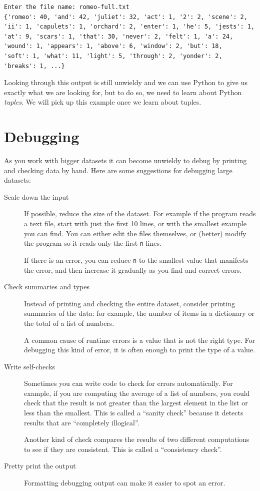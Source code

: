 \documentclass[10pt,]{book}
\begin{document}
{\small
\begin{verbatim}
Enter the file name: romeo-full.txt
{'romeo': 40, 'and': 42, 'juliet': 32, 'act': 1, '2': 2, 'scene': 2,
'ii': 1, 'capulets': 1, 'orchard': 2, 'enter': 1, 'he': 5, 'jests': 1,
'at': 9, 'scars': 1, 'that': 30, 'never': 2, 'felt': 1, 'a': 24,
'wound': 1, 'appears': 1, 'above': 6, 'window': 2, 'but': 18,
'soft': 1, 'what': 11, 'light': 5, 'through': 2, 'yonder': 2,
'breaks': 1, ...}
\end{verbatim}
}

Looking through this output is still unwieldy and we can use Python to
give us exactly what we are looking for, but to do so, we need to learn
about Python \emph{tuples}. We will pick up this example once we learn
about tuples.

\section{Debugging}\label{debugging-8}


As you work with bigger datasets it can become unwieldy to debug by
printing and checking data by hand. Here are some suggestions for
debugging large datasets:

\begin{description}
\item[Scale down the input]
If possible, reduce the size of the dataset. For example if the program
reads a text file, start with just the first 10 lines, or with the
smallest example you can find. You can either edit the files themselves,
or (better) modify the program so it reads only the first \texttt{n}
lines.

If there is an error, you can reduce \texttt{n} to the smallest value
that manifests the error, and then increase it gradually as you find and
correct errors.
\item[Check summaries and types]
Instead of printing and checking the entire dataset, consider printing
summaries of the data: for example, the number of items in a dictionary
or the total of a list of numbers.

A common cause of runtime errors is a value that is not the right type.
For debugging this kind of error, it is often enough to print the type
of a value.
\item[Write self-checks]
Sometimes you can write code to check for errors automatically. For
example, if you are computing the average of a list of numbers, you
could check that the result is not greater than the largest element in
the list or less than the smallest. This is called a ``sanity check''
because it detects results that are ``completely illogical''.
 

Another kind of check compares the results of two different computations
to see if they are consistent. This is called a ``consistency check''.
\item[Pretty print the output]
Formatting debugging output can make it easier to spot an error.
\end{description}
\end{document}
